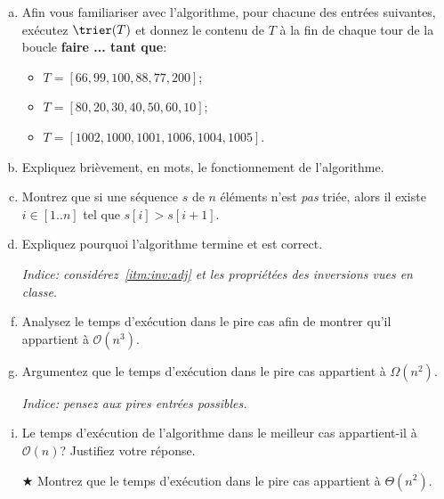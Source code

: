 \documentclass{article}
\newcommand{\avance}{{\large$\bigstar$}}         %
\newcommand{\avancepts}{{\scriptsize$\bigstar$}} %
\renewcommand{\O}{\mathcal{O}}                   %
\begin{document}
\begin{question}
\begin{enumerate}[(a)]
  \item Afin  vous familiariser avec
    l'algorithme, pour chacune des entrées suivantes, exécutez
    $\trier(T)$ et donnez le contenu de $T$ à la fin de chaque tour de
    la boucle \textbf{faire ... tant que}:\medskip
    \begin{itemize}
      \setlength\itemsep{5pt}
      
    \item $T = [66, 99, 100, 88, 77, 200]$;

    \item $T = [80, 20, 30, 40, 50, 60, 10]$;

    \item $T = [1002, 1000, 1001, 1006, 1004, 1005]$.

    \end{itemize}

  \item Expliquez  brièvement, en mots, le
    fonctionnement de l'algorithme.

  \item Montrez  que si une séquence $s$ de
    $n$ éléments n'est \emph{pas} triée, alors il existe $i \in
    [1..n]$ tel que $s[i] > s[i+1]$.\label{itm:inv:adj}

  \item Expliquez  pourquoi l'algorithme
    termine et est correct. \\[-25pt]

  \item[] \hfill \emph{Indice: considérez~\eqref{itm:inv:adj} et les
    propriétées des inversions vues en classe.}

  \item Analysez  le temps d'exécution dans
    le pire cas afin de montrer qu'il appartient à $\O(n^3)$.

  \item Argumentez  que le temps d'exécution
    dans le pire cas appartient à $\Omega(n^2)$. \\[-25pt]

  \item[] \hfill \emph{Indice: pensez aux \og pires entrées \fg{} possibles.}

  \item Le temps d'exécution  de l'algorithme
    dans le meilleur cas appartient-il à $\O(n)$? Justifiez votre
    réponse.

  \vspace*{0.75cm}
    
  \item[\avance{}] Montrez \marginpar{\avancepts{} \addbonus{2.5}} que
    le temps d'exécution dans le pire cas appartient à
    $\Theta(n^2)$.

  \end{enumerate}
\end{question}
\end{document}

